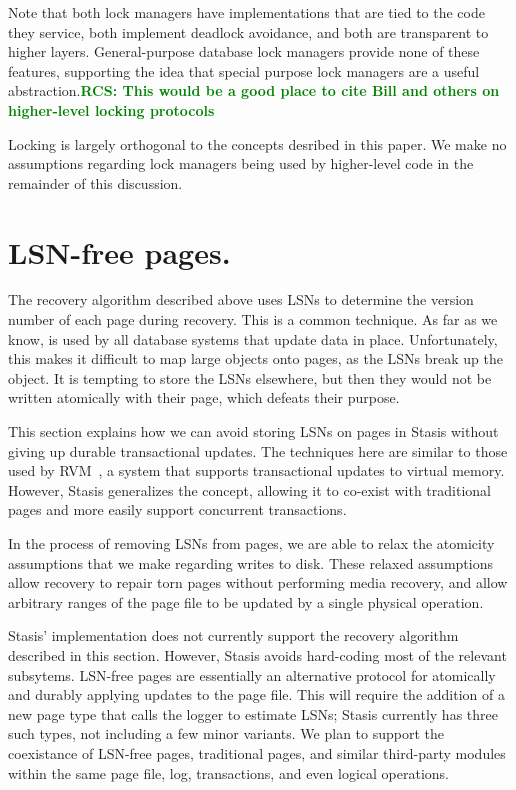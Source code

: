 \documentclass[letterpaper,twocolumn,10pt]{article}
\newcommand{\yad}{Stasis\xspace}
\newcommand{\yads}{Stasis'\xspace}
\newcommand{\rcs}[1]{\textcolor{green}{\bf RCS: #1}}
\begin{document}
Note that both lock managers have implementations that are tied to the
code they service, both implement deadlock avoidance, and both are
transparent to higher layers.  General-purpose database lock managers
provide none of these features, supporting the idea that special
purpose lock managers are a useful abstraction.\rcs{This would be a
good place to cite Bill and others on higher-level locking protocols}

Locking is largely orthogonal to the concepts desribed in this paper.
We make no assumptions regarding lock managers being used by higher-level code in the remainder of this discussion.

\section{LSN-free pages.}
\label{sec:lsn-free}
The recovery algorithm described above uses LSNs to determine the
version number of each page during recovery.  This is a common
technique.  As far as we know, is used by all database systems that
update data in place.  Unfortunately, this makes it difficult to map
large objects onto pages, as the LSNs break up the object.  It
is tempting to store the LSNs elsewhere, but then they would not be
written atomically with their page, which defeats their purpose.

This section explains how we can avoid storing LSNs on pages in \yad
without giving up durable transactional updates.  The techniques here
are similar to those used by RVM~\cite{lrvm}, a system that supports
transactional updates to virtual memory.  However, \yad generalizes
the concept, allowing it to co-exist with traditional pages and more easily
support concurrent transactions.

In the process of removing LSNs from pages, we
are able to relax the atomicity assumptions that we make regarding
writes to disk.  These relaxed assumptions allow recovery to repair
torn pages without performing media recovery, and allow arbitrary
ranges of the page file to be updated by a single physical operation.

\yads implementation does not currently support the recovery algorithm
described in this section.  However, \yad avoids hard-coding most of
the relevant subsytems.  LSN-free pages are essentially an alternative
protocol for atomically and durably applying updates to the page file.
This will require the addition of a new page type that calls the logger to estimate LSNs; \yad currently has
three such types, not including a few minor variants. We plan
to support the coexistance of LSN-free pages, traditional
pages, and similar third-party modules within the same page file, log,
transactions, and even logical operations.
\end{document}

